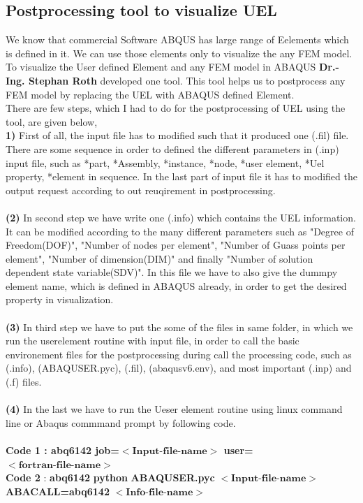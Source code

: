 \documentclass[12pt]{article}
\begin{document}
\begin{appendices}
\section{Postprocessing tool to visualize UEL}
We know that commercial Software ABQUS has large range of Eelements which is defined in it. We can use those elements only to visualize the any FEM model. To visualize the User defined Element and any FEM model in ABAQUS \textbf{Dr.-Ing. Stephan Roth} developed one tool. This tool helps us to postprocess any FEM model by replacing the UEL with ABAQUS defined Element.
\\
\newline
There are few steps, which I had to do for the postprocessing of UEL using the tool, are given below,
\newline
\\
\textbf{1)} First of all, the input file has to modified such that it produced one (.fil) file. There are some sequence in order to defined the different parameters in (.inp) input file, such as *part, *Assembly, *instance, *node, *user element, *Uel property, *element in sequence.
In the last part of input file it has to modified the output request according to out reuqirement in postprocessing.
\\
\\
\textbf{(2)} In second step we have write one (.info) which contains the UEL information. It can be modified according to the many different parameters such as "Degree of Freedom(DOF)", "Number of nodes per element", "Number of Guass points per element", "Number of dimension(DIM)" and finally "Number of solution dependent state variable(SDV)". In this file we have to also give the dummpy element name, which is defined in ABAQUS already, in order to get the desired property in visualization. 
\\
\\
\textbf{(3)} In third step we have to put the some of the files in same folder, in which we run the userelement routine with input file, in order to call the basic environement files for the postprocessing during call the processing code, such as (.info), (ABAQUSER.pyc), (.fil), (abaqusv6.env), and most important (.inp) and (.f) files.
\\
\\
\textbf{(4)} In the last we have to run the Ueser element routine using linux command line or Abaqus commmand prompt by following code.
\\
\\
\textbf{Code 1 : abq6142 job=$<\textbf{Input-file-name}>$ user=$<\textbf{fortran-file-name}>$}
\\
\textbf{Code 2} : \textbf{abq6142} \textbf{python} \textbf{ABAQUSER.pyc} $<\textbf{Input-file-name}>$ \\
\textbf{ABACALL=abq6142} $<\textbf{Info-file-name}>$


\end{appendices}





















\newpage


\end{document}
